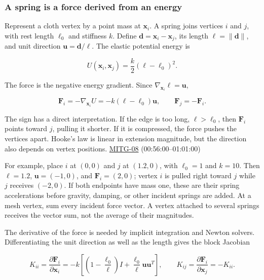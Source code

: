 \subsubsection{A spring is a force derived from an energy}\label{a-spring-is-a-force-derived-from-an-energy}

Represent a cloth vertex by a point mass at \(\boldsymbol{x}_i\). A spring joins vertices \(i\) and \(j\), with rest length \(\ell_0\) and stiffness \(k\). Define \(\boldsymbol{d}=\boldsymbol{x}_i-\boldsymbol{x}_j\), its length \(\ell=\|\boldsymbol{d}\|\), and unit direction \(\boldsymbol{u}=\boldsymbol{d}/\ell\). The elastic potential energy is

\[
U(\boldsymbol{x}_i,\boldsymbol{x}_j)=\frac{k}{2}(\ell-\ell_0)^2.
\]

The force is the negative energy gradient. Since \(\nabla_{\boldsymbol{x}_i}\ell=\boldsymbol{u}\),

\[
\boldsymbol{F}_i=-\nabla_{\boldsymbol{x}_i}U
=-k(\ell-\ell_0)\boldsymbol{u},\qquad
\boldsymbol{F}_j=-\boldsymbol{F}_i.
\]

The sign has a direct interpretation. If the edge is too long, \(\ell>\ell_0\), then \(\boldsymbol{F}_i\) points toward \(j\), pulling it shorter. If it is compressed, the force pushes the vertices apart. Hooke's law is linear in extension magnitude, but the direction also depends on vertex positions. \hyperref[04-visual-computing-ii-ch036]{MITG-08} (00:56:00--01:01:00)

For example, place \(i\) at \((0,0)\) and \(j\) at \((1.2,0)\), with \(\ell_0=1\) and \(k=10\). Then \(\ell=1.2\), \(\boldsymbol{u}=(-1,0)\), and \(\boldsymbol{F}_i=(2,0)\); vertex \(i\) is pulled right toward \(j\) while \(j\) receives \((-2,0)\). If both endpoints have mass one, these are their spring accelerations before gravity, damping, or other incident springs are added. At a mesh vertex, sum every incident force vector. A vertex attached to several springs receives the vector sum, not the average of their magnitudes.

The derivative of the force is needed by implicit integration and Newton solvers. Differentiating the unit direction as well as the length gives the block Jacobian

\[
K_{ii}=\frac{\partial\boldsymbol{F}_i}{\partial\boldsymbol{x}_i}
=-k\left[\left(1-\frac{\ell_0}{\ell}\right)I
+\frac{\ell_0}{\ell}\boldsymbol{u}\boldsymbol{u}^{T}\right],
\qquad
K_{ij}=\frac{\partial\boldsymbol{F}_i}{\partial\boldsymbol{x}_j}=-K_{ii}.
\]

